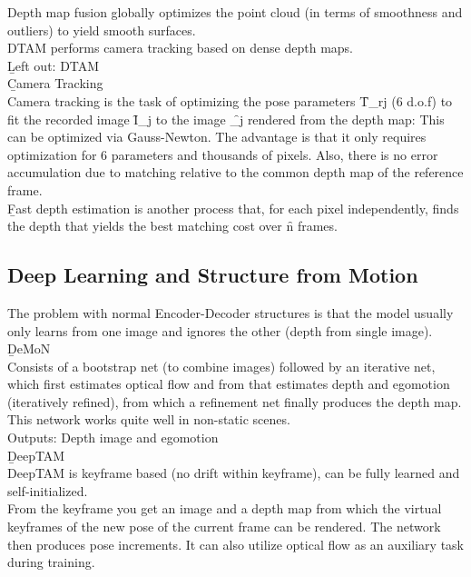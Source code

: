 Depth map fusion globally optimizes the point cloud (in terms of smoothness and outliers) to yield smooth surfaces.\\

DTAM performs camera tracking based on dense depth maps.\\

\b{Left out: DTAM}\\

\b{Camera Tracking\\[.5em]}
Camera tracking is the task of optimizing the pose parameters \f{T_{rj}} (6 d.o.f) to fit the recorded image \f{I_j} to the image \f{_j} rendered from the depth map:
This can be optimized via Gauss-Newton. The advantage is that it only requires optimization for 6 parameters and thousands of pixels. Also, there is no error accumulation due to matching relative to the common depth map of the reference frame.\\

\b{Fast depth estimation} is another process that, for each pixel independently, finds the depth that yields the best matching cost over \f{n} frames.

\subsection{Deep Learning and Structure from Motion}
The problem with normal Encoder-Decoder structures is that the model usually only learns from one image and ignores the other (depth from single image).\\

\b{DeMoN\\[0.5em]}
Consists of a bootstrap net (to combine images) followed by an iterative net, which first estimates optical flow and from that estimates depth and egomotion (iteratively refined), from which a refinement net finally produces the depth map. This network works quite well in non-static scenes.\\

Outputs: Depth image and egomotion\\

\b{DeepTAM\\[0.5em]}
DeepTAM is keyframe based (no drift within keyframe), can be fully learned and self-initialized.\\
From the keyframe you get an image and a depth map from which the virtual keyframes of the new pose of the current frame can be rendered. The network then produces pose increments. It can also utilize optical flow as an auxiliary task during training.

\newpage